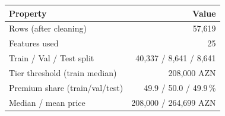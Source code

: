 \begin{tabular}{@{}lr@{}}
\toprule
Property & Value \\
\midrule
Rows (after cleaning) & 57,619 \\
Features used & 25 \\
Train / Val / Test split & 40,337 / 8,641 / 8,641 \\
Tier threshold (train median) & 208,000 AZN \\
Premium share (train/val/test) & 49.9 / 50.0 / 49.9\,\% \\
Median / mean price & 208,000 / 264,699 AZN \\
\bottomrule
\end{tabular}
